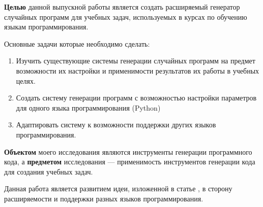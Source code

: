 \textbf{Целью} данной выпускной работы является
создать расширяемый генератор случайных программ для учебных задач, используемых в курсах по обучению языкам программирования.

Основные задачи которые необходимо сделать:
\begin{enumerate}[label=\alph*.]
    \item Изучить существующие системы генерации случайных программ на предмет возможности их
          настройки и применимости результатов их работы в учебных целях.
    \item Создать систему
          генерации программ с возможностью настройки параметров для одного языка программирования (Python)
    \item Адаптировать систему к возможности поддержки других языков программирования.
\end{enumerate}

\textbf{Объектом} моего исследования являются инструменты генерации программного кода, а
\textbf{предметом} исследования --- применимость инструментов генерации кода для создания учебных задач.

Данная работа является развитием идеи, изложенной в статье \cite{haphiz}, в сторону расширяемости и поддержки разных языков программирования.